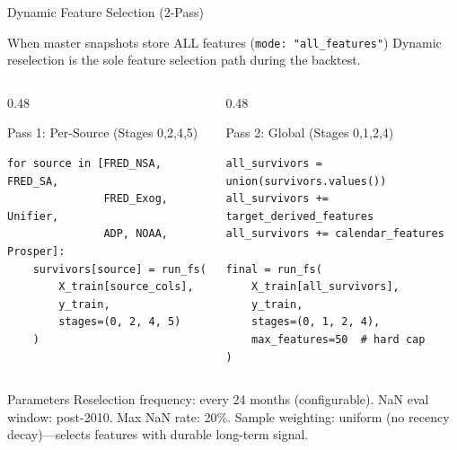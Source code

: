 \documentclass[aspectratio=169,10pt]{beamer}
\begin{document}
\begin{frame}[fragile]{Dynamic Feature Selection (2-Pass)}
\begin{block}{When master snapshots store ALL features (\texttt{mode: "all\_features"})}
\footnotesize
Dynamic reselection is the sole feature selection path during the backtest.
\end{block}

\vspace{0.2cm}
\begin{columns}[T]
\begin{column}{0.48\textwidth}
\begin{block}{Pass 1: Per-Source (Stages 0,2,4,5)}
\begin{lstlisting}[style=pseudo]
for source in [FRED_NSA, FRED_SA,
               FRED_Exog, Unifier,
               ADP, NOAA, Prosper]:
    survivors[source] = run_fs(
        X_train[source_cols],
        y_train,
        stages=(0, 2, 4, 5)
    )
\end{lstlisting}
\end{block}
\end{column}
\begin{column}{0.48\textwidth}
\begin{block}{Pass 2: Global (Stages 0,1,2,4)}
\begin{lstlisting}[style=pseudo]
all_survivors = union(survivors.values())
all_survivors += target_derived_features
all_survivors += calendar_features

final = run_fs(
    X_train[all_survivors],
    y_train,
    stages=(0, 1, 2, 4),
    max_features=50  # hard cap
)
\end{lstlisting}
\end{block}
\end{column}
\end{columns}

\vspace{0.2cm}
\begin{exampleblock}{Parameters}
\scriptsize
Reselection frequency: every 24 months (configurable). NaN eval window: post-2010. Max NaN rate: 20\%.
Sample weighting: uniform (no recency decay)---selects features with durable long-term signal.
\end{exampleblock}
\end{frame}
\end{document}
